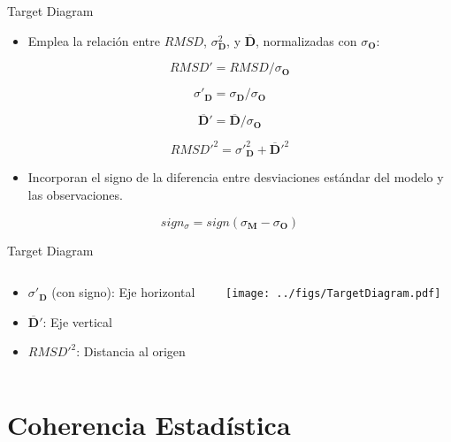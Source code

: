 \documentclass[aspectratio=169, usenames,svgnames,dvipsnames]{beamer}
\begin{document}
\begin{frame}[label={sec:org7eb7695}]{Target Diagram}
\begin{itemize}
\item Emplea la relación entre \(RMSD\), \(\sigma^2_{\mathbf{D}}\), y \(\overline{\mathbf{D}}\), normalizadas con \(\sigma_{\mathbf{O}}\):
\end{itemize}
\[
RMSD' = RMSD / \sigma_{\mathbf{O}}
\]

\[
  \sigma'_{\mathbf{D}} = \sigma_{\mathbf{D}} / \sigma_{\mathbf{O}} 
\]

\[
\overline{\mathbf{D}}' = \overline{\mathbf{D}} / \sigma_{\mathbf{O}}
\]

\[
RMSD'^2= \sigma'^2_{\mathbf{D}} + \overline{\mathbf{D}}'^2
\]

\begin{itemize}
\item Incorporan el signo de la diferencia entre desviaciones estándar del modelo y las observaciones.
\end{itemize}

\[
sign_{\sigma} =  sign(\sigma_{\mathbf{M}} - \sigma_{\mathbf{O}} )
\]


\nocite{Jolliff.Kindle.ea2009}
\end{frame}

\begin{frame}[label={sec:orgd79527a}]{Target Diagram}
\begin{columns}
\begin{column}{0.3\columnwidth}
\begin{itemize}
\item \(\sigma'_{\mathbf{D}}\) (con signo): Eje horizontal
\item \(\overline{\mathbf{D}}'\): Eje vertical
\item \(RMSD'^2\): Distancia al origen
\end{itemize}
\end{column}

\begin{column}{0.7\columnwidth}
\begin{center}
\texttt{[image: ../figs/TargetDiagram.pdf]}
\end{center}
\end{column}
\end{columns}
\end{frame}


\section{Coherencia Estadística}
\label{sec:org42bcc72}
\end{document}
